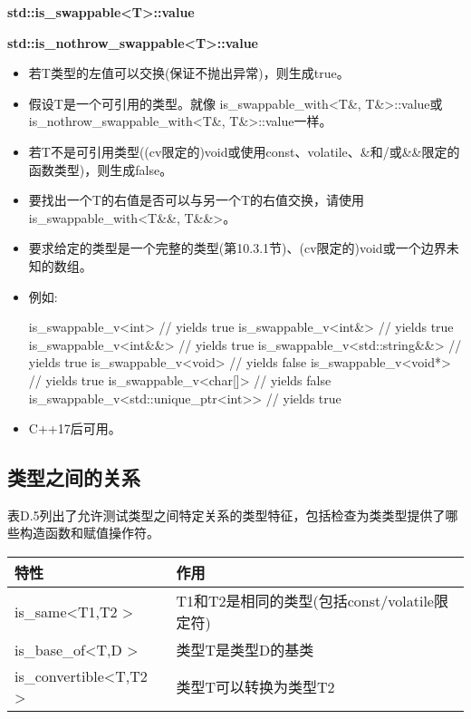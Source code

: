 \textbf{std::is\_swappable<T>::value}

\textbf{std::is\_nothrow\_swappable<T>::value}

\begin{itemize}
\item
若T类型的左值可以交换(保证不抛出异常)，则生成true。

\item
假设T是一个可引用的类型。就像 is\_swappable\_with<T\&, T\&>::value或is\_nothrow\_swappable\_with<T\&, T\&>::value一样。

\item
若T不是可引用类型((cv限定的)void或使用const、volatile、\&和/或\&\&限定的函数类型)，则生成false。

\item
要找出一个T的右值是否可以与另一个T的右值交换，请使用is\_swappable\_with<T\&\&, T\&\&>。

\item
要求给定的类型是一个完整的类型(第10.3.1节)、(cv限定的)void或一个边界未知的数组。

\item
例如:
\begin{cpp}
is_swappable_v<int> // yields true
is_swappable_v<int&> // yields true
is_swappable_v<int&&> // yields true
is_swappable_v<std::string&&> // yields true
is_swappable_v<void> // yields false
is_swappable_v<void*> // yields true
is_swappable_v<char[]> // yields false
is_swappable_v<std::unique_ptr<int>> // yields true
\end{cpp}

\item
C++17后可用。
\end{itemize}

\subsection{类型之间的关系}

表D.5列出了允许测试类型之间特定关系的类型特征，包括检查为类类型提供了哪些构造函数和赋值操作符。

\begin{table}[H]
	\begin{center}
	\begin{tabular}{l|l}
		\hline
		\textbf{特性}                                & \textbf{作用}                                                    \\ \hline
		is\_same\textless{}T1,T2 \textgreater{}       & T1和T2是相同的类型(包括const/volatile限定符)\\ \hline
		is\_base\_of\textless{}T,D \textgreater{}     & 类型T是类型D的基类                                     \\ \hline
		is\_convertible\textless{}T,T2 \textgreater{} & 类型T可以转换为类型T2                                 \\ \hline
	\end{tabular}
	\end{center}
\end{table}

